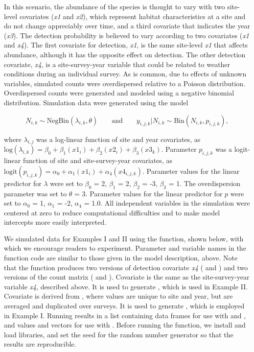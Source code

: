 \documentclass[codesnippet]{jss}
\begin{document}
In this scenario, the abundance of the species is thought to vary with two 
site-level covariates (\textit{x1} and \textit{x2}), which represent habitat 
characteristics at a site and do not change appreciably over time, and a 
third covariate that indicates the year (\textit{x3}). The detection 
probability is believed to vary according to two covariates (\textit{x1} and 
\textit{x4}). The first covariate for detection, \textit{x1}, is the same 
site-level \textit{x1} that affects abundance, although it has the opposite 
effect on detection. The other detection covariate, \textit{x4}, is a 
site-survey-year variable that could be related to weather conditions during 
an individual survey. As is common, due to effects of unknown variables, 
simulated counts were overdispersed relative to a Poisson distribution. 
Overdispersed counts were generated and 
modeled using a negative binomial distribution. Simulation data were 
generated using the model

\begin{equation} \label{eq2}
N_{i,k} \sim \text{NegBin}(\lambda_{i,k}, \theta) \qquad \text{and} \qquad  
y_{i,j,k} | N_{i,k} \sim \text{Bin}(N_{i,k}, p_{i,j,k}),
\end{equation}

where $\lambda_{i,j}$ was a log-linear function of site and year covariates, 
as $\text{log}(\lambda_{i,k}) = \beta_0 + \beta_1 (\textit{x1}_{i}) + 
\beta_2 (\textit{x2}_{i}) + \beta_3 (\textit{x3}_{k})$. Parameter 
$p_{i,j,k}$ was a logit-linear function of site and site-survey-year 
covariates, as $\text{logit}(p_{i,j,k}) = \alpha_0 + \alpha_1 
(\textit{x1}_{i}) + \alpha_4 (\textit{x4}_{i,j,k})$. Parameter values for 
the linear predictor for $\lambda$ were set to $\beta_0$ = 2, $\beta_1$ = 
2, $\beta_2$ = -3, $\beta_3$ = 1. The overdispersion parameter was set 
to $\theta$ = 3. Parameter values for the linear predictor for $p$ were 
set to $\alpha_0$ = 1, $\alpha_1$ = -2, $\alpha_4$ = 1.0. All 
independent variables in the simulation were centered at zero to reduce 
computational difficulties and to make model intercepts more easily 
interpreted.

We simulated data for Examples I and II using the  
function, shown below, with which we encourage readers to experiment. 
Parameter and variable names in the function code are similar to those given 
in the model description, above. Note that the function produces two 
versions of detection covariate \textit{x4} ( and ) and 
two versions of the count matrix ( and ). Covariate 
 is the same as the site-survey-year variable \textit{x4}, 
described above. It is used to generate , which is used in Example 
II. Covariate  is derived from , where values are unique 
to site and year, but are averaged and duplicated over surveys. It is used 
to generate , which is employed in Example I. Running 
 results in a list containing data frames for use with 
 and , and values and vectors for use with 
. Before running the function, we install and load libraries, 
and set the seed for the random number generator so that the results are 
reproducible.
\end{document}
